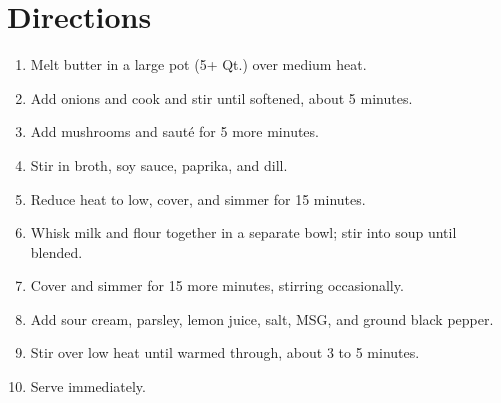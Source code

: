 \documentclass[11pt,letterpaper]{article}
\begin{document}
\section*{Directions}
\begin{enumerate}
    \item Melt butter in a large pot (5+ Qt.) over medium heat.
    \item Add onions and cook and stir until softened, about 5 minutes.
    \item Add mushrooms and sauté for 5 more minutes.
    \item Stir in broth, soy sauce, paprika, and dill.
    \item Reduce heat to low, cover, and simmer for 15 minutes.
    \item Whisk milk and flour together in a separate bowl; stir into soup until blended.
    \item Cover and simmer for 15 more minutes, stirring occasionally.
    \item Add sour cream, parsley, lemon juice, salt, MSG, and ground black pepper.
    \item Stir over low heat until warmed through, about 3 to 5 minutes.
    \item Serve immediately.
\end{enumerate}
\end{document}
